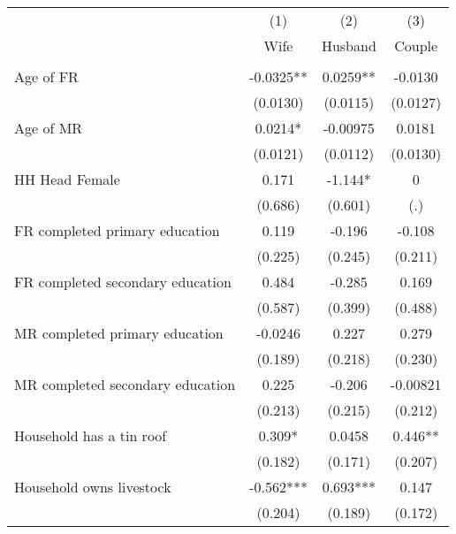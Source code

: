 {
\def\sym#1{\ifmmode^{#1}\else\(^{#1}\)\fi}
\begin{tabular}{l*{3}{c}}
\hline\hline
                    &\multicolumn{1}{c}{(1)}   &\multicolumn{1}{c}{(2)}   &\multicolumn{1}{c}{(3)}   \\
                    &        Wife   &     Husband   &      Couple   \\
\hline
                    &               &               &               \\
Age of FR           &     -0.0325** &      0.0259** &     -0.0130   \\
                    &    (0.0130)   &    (0.0115)   &    (0.0127)   \\
[1em]
Age of MR           &      0.0214*  &    -0.00975   &      0.0181   \\
                    &    (0.0121)   &    (0.0112)   &    (0.0130)   \\
[1em]
HH Head Female      &       0.171   &      -1.144*  &           0   \\
                    &     (0.686)   &     (0.601)   &         (.)   \\
[1em]
FR completed primary education&       0.119   &      -0.196   &      -0.108   \\
                    &     (0.225)   &     (0.245)   &     (0.211)   \\
[1em]
FR completed secondary education&       0.484   &      -0.285   &       0.169   \\
                    &     (0.587)   &     (0.399)   &     (0.488)   \\
[1em]
MR completed primary education&     -0.0246   &       0.227   &       0.279   \\
                    &     (0.189)   &     (0.218)   &     (0.230)   \\
[1em]
MR completed secondary education&       0.225   &      -0.206   &    -0.00821   \\
                    &     (0.213)   &     (0.215)   &     (0.212)   \\
[1em]
Household has a tin roof&       0.309*  &      0.0458   &       0.446** \\
                    &     (0.182)   &     (0.171)   &     (0.207)   \\
[1em]
Household owns livestock&      -0.562***&       0.693***&       0.147   \\
                    &     (0.204)   &     (0.189)   &     (0.172)   \\
[1em]

\end{tabular}}
